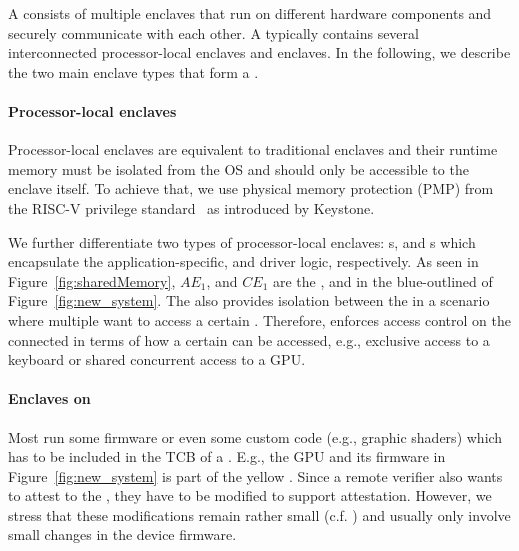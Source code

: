 A \nameenclave{} consists of multiple enclaves that run on different hardware components and securely communicate with each other. A \nameenclave{} typically contains several interconnected processor-local enclaves and \sphw enclaves. In the following, we describe the two main enclave types that form a \nameenclave{}.

\paragraph{Processor-local enclaves}
\label{sec:overview:enclaves:processorEnclave}

Processor-local enclaves are equivalent to traditional enclaves and their runtime memory must be isolated from the OS and should only be accessible to the enclave itself. To achieve that, we use physical memory protection (PMP) from the RISC-V privilege standard~\cite{riscv2019privspec} as introduced by Keystone.

We further differentiate two types of processor-local enclaves: \app{}s, and \ce{}s which encapsulate the application-specific, and driver logic, respectively. As seen in Figure~\ref{fig:sharedMemory}, $AE_1$, and $CE_1$ are the \app, and \ce in the blue-outlined \nameenclave of Figure~\ref{fig:new_system}. The \ce also provides isolation between the \apps in a scenario where multiple \apps want to access a certain \sphw. Therefore, \ce enforces access control on the connected \apps in terms of how a certain \sphw can be accessed, e.g., exclusive access to a keyboard or shared concurrent access to a GPU. 

\paragraph{Enclaves on \sphw}
\label{sec:overview:enclaves:peripheralEnclave}
Most \sphw run some firmware or even some custom code (e.g., graphic shaders) which has to be included in the TCB of a \nameenclave.
E.g., the GPU and its firmware in Figure~\ref{fig:new_system} is part of the yellow \nameenclave. Since a remote verifier also wants to attest to the \sphw, they have to be modified to support attestation. However, we stress that these modifications  remain rather small (c.f. ) and usually only involve small changes in the device firmware. %

